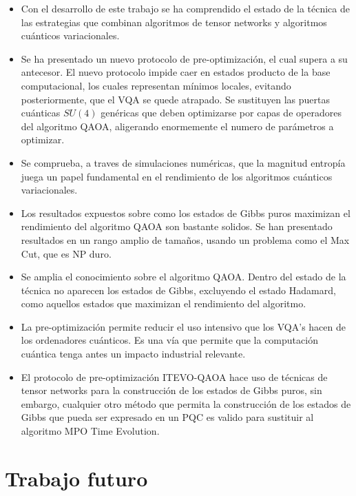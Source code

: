 \begin{itemize}

\item Con el desarrollo de este trabajo se ha comprendido el estado de la técnica de las estrategias que combinan algoritmos de tensor networks y algoritmos cuánticos variacionales.

\item Se ha presentado un nuevo protocolo de pre-optimización, el cual supera a su antecesor. El nuevo protocolo impide caer en estados producto de la base computacional, los cuales representan mínimos locales, evitando posteriormente, que el VQA se quede atrapado. Se sustituyen las puertas cuánticas $SU(4)$ genéricas que deben optimizarse por capas de operadores del algoritmo QAOA, aligerando enormemente el numero de parámetros a optimizar.

\item Se comprueba, a traves de simulaciones numéricas, que la magnitud entropía juega un papel fundamental en el rendimiento de los algoritmos cuánticos variacionales.

\item Los resultados expuestos sobre como los estados de Gibbs puros maximizan el rendimiento del algoritmo QAOA son bastante solidos. Se han presentado resultados en un rango amplio de tamaños, usando un problema como el Max Cut, que es NP duro.

\item Se amplia el conocimiento sobre el algoritmo QAOA. Dentro del estado de la técnica no aparecen los estados de Gibbs, excluyendo el estado Hadamard, como aquellos estados que maximizan el rendimiento del algoritmo. 

\item La pre-optimización permite reducir el uso intensivo que los VQA's hacen de los ordenadores cuánticos. Es una vía que permite que la computación cuántica tenga antes un impacto industrial relevante.

\item El protocolo de pre-optimización ITEVO-QAOA hace uso de técnicas de tensor networks para la construcción de los estados de Gibbs puros, sin embargo, cualquier otro método que permita la construcción de los estados de Gibbs que pueda ser expresado en un PQC es valido para sustituir al algoritmo MPO Time Evolution.

\end{itemize}

\section{Trabajo futuro}

